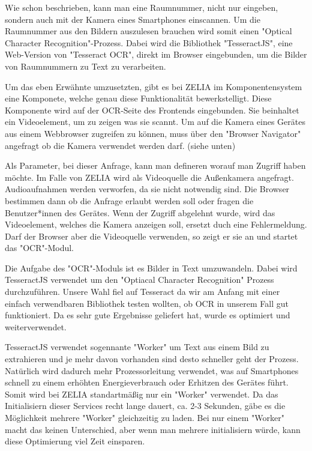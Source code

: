 

Wie schon beschrieben, kann man eine Raumnummer, nicht nur eingeben, sondern auch mit der Kamera eines Smartphones einscannen. Um die Raumnummer aus den Bildern auszulesen brauchen wird somit einen "Optical Character Recognition"-Prozess. Dabei wird die Bibliothek "TesseractJS", eine Web-Version von "Tesseract OCR", direkt im Browser eingebunden, um die Bilder von Raumnummern zu Text zu verarbeiten.

Um das eben Erwähnte umzusetzten, gibt es bei ZELIA im Komponentensystem eine Komponete, welche genau diese Funktionalität bewerkstelligt. Diese Komponente wird auf der OCR-Seite des Frontends eingebunden. Sie beinhaltet ein Videoelement, um zu zeigen was sie scannt. Um auf die Kamera eines Gerätes aus einem Webbrowser zugreifen zu können, muss über den "Browser Navigator" angefragt ob die Kamera verwendet werden darf. (siehe unten)


Als Parameter, bei dieser Anfrage, kann man defineren worauf man Zugriff haben möchte. Im Falle von ZELIA wird als Videoquelle die Außenkamera angefragt. Audioaufnahmen werden verworfen, da sie nicht notwendig sind. Die Browser bestimmen dann ob die Anfrage erlaubt werden soll oder fragen die Benutzer*innen des Gerätes. Wenn der Zugriff abgelehnt wurde, wird das Videoelement, welches die Kamera anzeigen soll, ersetzt duch eine Fehlermeldung. Darf der Browser aber die Videoquelle verwenden, so zeigt er sie an und startet das "OCR"-Modul.


Die Aufgabe des "OCR"-Moduls ist es Bilder in Text umzuwandeln. Dabei wird TesseractJS verwendet um den "Optiacal Character Recognition" Prozess durchzuführen. Unsere Wahl fiel auf Tesseract da wir am Anfang mit einer einfach verwendbaren Bibliothek testen wollten, ob OCR in unserem Fall gut funktioniert. Da es sehr gute Ergebnisse geliefert hat, wurde es optimiert und weiterverwendet.


TesseractJS verwendet sogennante "Worker" um Text aus einem Bild zu extrahieren und je mehr davon vorhanden sind desto schneller geht der Prozess. Natürlich wird dadurch mehr Prozessorleitung verwendet, was auf Smartphones schnell zu einem erhöhten Energieverbrauch oder Erhitzen des Gerätes führt. Somit wird bei ZELIA standartmäßig nur ein "Worker" verwendet. Da das Initialisiern dieser Services recht lange dauert, ca. 2-3 Sekunden, gäbe es die Möglichkeit mehrere "Worker" gleichzeitig zu laden. Bei nur einem "Worker" macht das keinen Unterschied, aber wenn man mehrere initialisiern würde, kann diese Optimierung viel Zeit einsparen.

